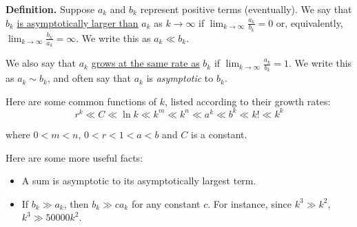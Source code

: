 \documentclass[main]{subfiles}
\begin{document}
  
  \probonly{\vfill}
  

  \begin{framed}
  \textbf{Definition.}  Suppose $a_k$ and $b_k$ represent positive terms (eventually). We say that $b_k$ \uline{is asymptotically larger than} $a_k$
  as $k \to \infty$ if $\boxed{\displaystyle \lim_{k \to \infty}
  \frac{a_k}{b_k} = 0}$ or, equivalently, $\boxed{\displaystyle \lim_{k \to
  \infty} \frac{b_k}{a_k} = \infty}$.  We write this as $\boxed{a_k \ll b_k}$. 
  
  We also say that $a_k$ \uline{grows at the same rate as} $b_k$ if  $\boxed{\displaystyle \lim_{k \to \infty}
  \frac{a_k}{b_k} = 1}$. We write this as $\boxed{a_k \sim b_k}$, and often say that $a_k$ is \textit{asymptotic} to $b_k$.

  Here are some common functions of $k$, listed according to their growth
  rates:
  \begin{equation*} 
  r^k \ll C \ll \ln k \ll k^m \ll k^n \ll a^k \ll b^k \ll k! \ll k^k 
  \end{equation*}
  
 where $0 < m < n$, $0 < r < 1 < a < b$ and $C$ is a constant.
 
  Here are some more useful facts:
  \begin{itemize}[itemsep=0pt,topsep=0pt]
  \item A sum is asymptotic to its asymptotically largest term.
  \item If $b_k \gg a_k$, then $b_k \gg c a_k$ for any constant $c$.
  For instance, since $k^3 \gg k^2$, $k^3 \gg 50000 k^2$.
\end{itemize}
\end{framed}


\pspace{\newpage}
\end{document}

